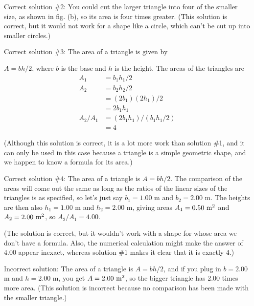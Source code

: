 Correct solution \#2: You could cut the larger triangle into
four of the smaller size, as shown in fig. (b), so its area
is four times greater. (This solution is correct, but it
would not work for a shape like a circle, which can't be cut
up into smaller circles.)

Correct solution \#3: The area of a triangle is given by

$A=bh/2$, where $b$ is the base and $h$ is the height. The
areas of the triangles are
\begin{align*}
 A_1 &= b_1 h_1/2\\
 A_2 &= b_2 h_2/2\\
 &= (2b_1)(2h_1)/2 \\
 &= 2b_1 h_1\\
 A_2/A_1 &=(2b_1 h_1)/(b_1 h_1/2)\\
 &= 4
\end{align*}

(Although this solution is correct, it is a lot more work
than solution \#1, and it can only be used in this case
because a triangle is a simple geometric shape, and we
happen to know a formula for its area.)

Correct solution \#4: The area of a triangle is $A= bh/2$.
The comparison of the areas will come out the same as long
as the ratios of the linear sizes of the triangles is as
specified, so let's just say $b_1=1.00$ m and $b_2=2.00$
m. The heights are then also $h_1=1.00$ m and $h_2=2.00$
m, giving areas $A_1=0.50\ \textup{m}^2$ and $A_2=2.00\ \textup{m}^2$, so $A_2/A_1=4.00$.

(The solution is correct, but it wouldn't work with a shape
for whose area we don't have a formula. Also, the numerical
calculation might make the answer of 4.00 appear inexact,
whereas solution \#1 makes it clear that it is exactly 4.)

\enlargethispage{\baselineskip}

Incorrect solution: The area of a triangle is $A=bh/2$, and
if you plug in $b=2.00$ m and $h=2.00$ m, you get $A=2.00\ \textup{m}^2$,
so the bigger triangle has 2.00 times more area. (This
solution is incorrect because no comparison has been made
with the smaller triangle.)

\vfill\pagebreak[4]

